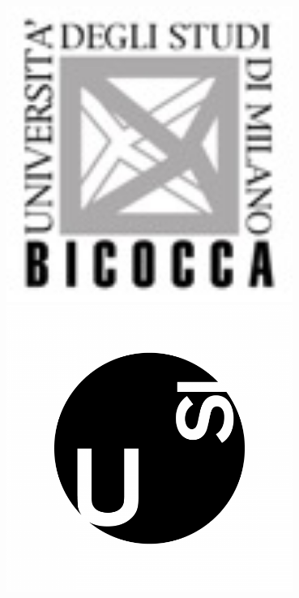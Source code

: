 \documentclass[a4paper,12pt,twoside,openright]{book}
\begin{document}



\begin{titlepage}
	\begin{minipage}{0.30\linewidth}
		\includegraphics[width=0.7\textwidth]{./img/logo-bicocca-bw.jpg}\\%
		\includegraphics[width=0.7\textwidth]{./img/press-usi-immagini-logo-square.png}%
	\end{minipage}	
	\begin{minipage}{0.67\linewidth}
		\begin{flushleft}

\end{flushleft}
\end{minipage}
\end{titlepage}
\end{document}
